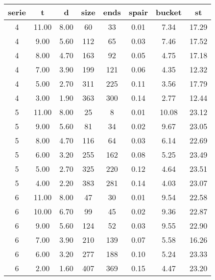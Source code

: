 \begin{tabular}{|c|c|c|c|c|c|c|c|}
\hline
\textbf{serie} & \textbf{t} & \textbf{d} & \textbf{size} & \textbf{ends} & \textbf{spair} & \textbf{bucket} & \textbf{st}\\
\hline
4 & 11.00 & 8.00 & 60 & 33 & 0.01 & 7.34 & 17.29\\
\hline
4 & 9.00 & 5.60 & 112 & 65 & 0.03 & 7.46 & 17.52\\
\hline
4 & 8.00 & 4.70 & 163 & 92 & 0.05 & 4.75 & 17.18\\
\hline
4 & 7.00 & 3.90 & 199 & 121 & 0.06 & 4.35 & 12.32\\
\hline
4 & 5.00 & 2.70 & 311 & 225 & 0.11 & 3.56 & 17.79\\
\hline
4 & 3.00 & 1.90 & 363 & 300 & 0.14 & 2.77 & 12.44\\
\hline

5 & 11.00 & 8.00 & 25 & 8 & 0.01 & 10.08 & 23.12\\
\hline
5 & 9.00 & 5.60 & 81 & 34 & 0.02 & 9.67 & 23.05\\
\hline
5 & 8.00 & 4.70 & 116 & 64 & 0.03 & 6.14 & 22.69\\
\hline
5 & 6.00 & 3.20 & 255 & 162 & 0.08 & 5.25 & 23.49\\
\hline
5 & 5.00 & 2.70 & 325 & 220 & 0.12 & 4.64 & 23.51\\
\hline
5 & 4.00 & 2.20 & 383 & 281 & 0.14 & 4.03 & 23.07\\
\hline

6 & 11.00 & 8.00 & 47 & 30 & 0.01 & 9.54 & 22.58\\
\hline
6 & 10.00 & 6.70 & 99 & 45 & 0.02 & 9.36 & 22.87\\
\hline
6 & 9.00 & 5.60 & 124 & 52 & 0.03 & 9.55 & 22.90\\
\hline
6 & 7.00 & 3.90 & 210 & 139 & 0.07 & 5.58 & 16.26\\
\hline
6 & 6.00 & 3.20 & 277 & 188 & 0.10 & 5.24 & 23.33\\
\hline
6 & 2.00 & 1.60 & 407 & 369 & 0.15 & 4.47 & 23.20\\
\hline
\end{tabular}
